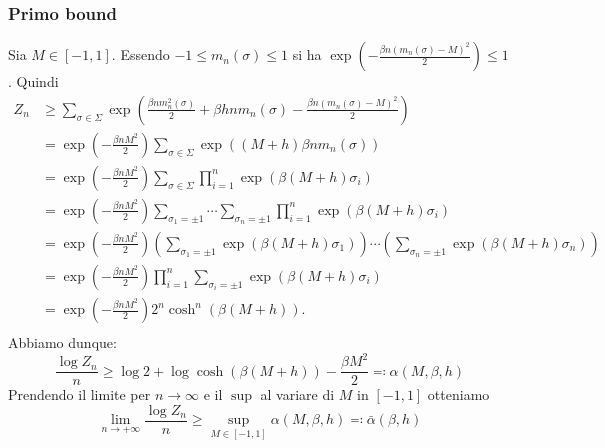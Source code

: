 \subsubsection{Primo bound}
Sia $ M \in [-1,1] $. Essendo $ -1 \leq m_n(\sigma) \leq 1 $ si ha $ \exp\left( -\frac{\beta n (m_n(\sigma) - M)^2}{2} \right) \leq 1 $. Quindi
\begin{align*}
    Z_n & \geq \sum_{\sigma \in \Sigma} \exp\left( \frac{\beta n m_n^2(\sigma)}{2} + \beta h n m_n(\sigma) - \frac{\beta n (m_n(\sigma)-M)^2}{2}\right) \\
        & = \exp\left( -\frac{\beta n M^2}{2} \right) \sum_{\sigma \in \Sigma} \exp\left( (M+h) \beta n m_n(\sigma) \right)                              \\
        & = \exp\left( -\frac{\beta n M^2}{2} \right) \sum_{\sigma \in \Sigma} \prod_{i=1}^{n} \exp( \beta(M+h) \sigma_i )                               \\
        & = \exp\left( -\frac{\beta n M^2}{2} \right) \sum_{\sigma_1 = \pm 1} \cdots \sum_{\sigma_n = \pm 1} \prod_{i=1}^{n} \exp( \beta(M+h) \sigma_i ) \\
        & = \exp\left( -\frac{\beta n M^2}{2} \right) \left(\sum_{\sigma_1 = \pm 1} \exp(\beta(M+h)\sigma_1)\right) \cdots \left(\sum_{\sigma_n = \pm 1} \exp(\beta(M+h)\sigma_n)\right) \\
        & = \exp\left( -\frac{\beta n M^2}{2} \right) \prod_{i=1}^{n} \sum_{\sigma_i = \pm 1} \exp(\beta(M+h)\sigma_i) \\
        & = \exp\left( -\frac{\beta n M^2}{2} \right) 2^n \cosh^n(\beta(M+h)). \\
\end{align*}
Abbiamo dunque:
\[ \frac{\log Z_n}{n} \geq \log 2 + \log\cosh(\beta(M+h)) - \frac{\beta M^2}{2} \eqqcolon \alpha(M, \beta, h) \]
Prendendo il limite per $ n\to\infty $ e il $ \sup $ al variare di $ M $ in $ [-1,1] $ otteniamo
\[ \lim_{n \to +\infty}\frac{\log Z_n}{n} \geq \sup_{M\in[-1,1]} \alpha(M, \beta, h) \eqqcolon \bar{\alpha}(\beta, h) \]

